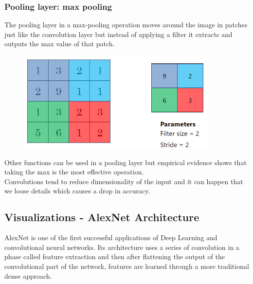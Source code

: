 \documentclass{article}
\begin{document}
\subsubsection*{Pooling layer: max pooling}
The pooling layer in a max-pooling operation moves around the image in patches just like the convolution layer but instead of applying a filter it extracts and outputs the max value of that patch.
\begin{figure}[htbp]
    \centering
    \includegraphics[width=10cm]{max_pooling.png}
\end{figure}
Other functions can be used in a pooling layer but empirical evidence shows that taking the max is the most effective operation.\\
Convolutions tend to reduce dimensionality of the input and it can happen that we loose details which causes a drop in accuracy.
\subsection{Visualizations - AlexNet Architecture}
AlexNet is one of the first successful applications of Deep Learning and convolutional neural networks. Its architecture uses a series of convolution in a phase called feature extraction and then after flattening the output of the convolutional part of the network, features are learned through a more traditional dense approach.\\
\end{document}
